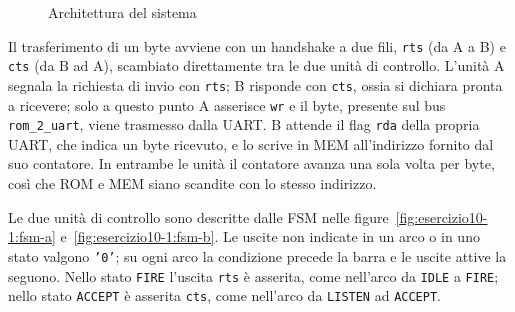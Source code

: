 \begin{figure}[H]
{}
  \caption{Architettura del sistema}
  \label{fig:esercizio10-1:schema}
\end{figure}

Il trasferimento di un byte avviene con un handshake a due fili, \texttt{rts} (da A a B) e \texttt{cts} (da B ad A), scambiato direttamente tra le due unità di controllo. L'unità A segnala la richiesta di invio con \texttt{rts}; B risponde con \texttt{cts}, ossia si dichiara pronta a ricevere; solo a questo punto A asserisce \texttt{wr} e il byte, presente sul bus \texttt{rom\_2\_uart}, viene trasmesso dalla UART. B attende il flag \texttt{rda} della propria UART, che indica un byte ricevuto, e lo scrive in MEM all'indirizzo fornito dal suo contatore. In entrambe le unità il contatore avanza una sola volta per byte, così che ROM e MEM siano scandite con lo stesso indirizzo.

Le due unità di controllo sono descritte dalle FSM nelle figure~\ref{fig:esercizio10-1:fsm-a} e~\ref{fig:esercizio10-1:fsm-b}. Le uscite non indicate in un arco o in uno stato valgono \texttt{'0'}; su ogni arco la condizione precede la barra e le uscite attive la seguono. Nello stato \texttt{FIRE} l'uscita \texttt{rts} è asserita, come nell'arco da \texttt{IDLE} a \texttt{FIRE}; nello stato \texttt{ACCEPT} è asserita \texttt{cts}, come nell'arco da \texttt{LISTEN} ad \texttt{ACCEPT}.

